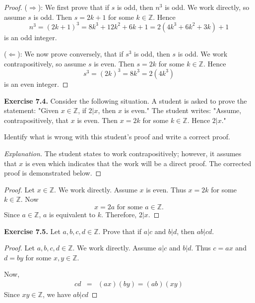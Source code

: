 \documentclass[12pt,oneside]{article}
\newenvironment{exercise}[1]{\vspace{.1in}\noindent\textbf{Exercise #1 \hspace{.05em}}}{}
\newcommand{\Z}{\mathbb{Z}}
\begin{document}
\begin{proof}
($\Rightarrow$): We first prove that if $s$ is odd, then $n^3$ is odd. We work directly, so assume $s$ is odd. Then $s=2k + 1$ for some $k \in \Z$. Hence
\[n^3 = (2k + 1)^3=8k^3+12k^2+6k+1=2(4k^3+6k^2+3k)+1\]
is an odd integer.

($\Leftarrow$): We now prove conversely, that if $s^3$ is odd, then $s$ is odd. We work contrapositively, so assume $s$ is even. Then $s = 2k$ for some $k \in \Z$. Hence
\[s^3=(2k)^3=8k^3=2(4k^3)\]
is an even integer. 
    
\end{proof}



\begin{exercise}{7.4.}
Consider the following situation. A student is asked to prove the statement: "Given $x \in \Z$, if $2|x$, then $x$ is even." The student writes: "Assume, contrapositively, that $x$ is even. Then $x = 2k$ for some $k \in \Z$. Hence $2|x$."

Identify what is wrong with this student's proof and write a correct proof.
\end{exercise}

\begin{proof}[Explanation]
The student states to work contrapositively; however, it assumes that $x$ is even which indicates that the work will be a direct proof. The corrected proof is demonstrated below.
\end{proof}

\begin{proof}
Let $x \in \Z$. We work directly. Assume $x$ is even. Thus $x = 2k$ for some $k \in \Z$. Now
\[x = 2a \text{ for some } a \in \Z.\]
Since $a \in \Z$, $a$ is equivalent to $k$. Therefore, $2|x$.
\end{proof}



\begin{exercise}{7.5.}
Let $a,b,c,d \in \Z$. Prove that if $a|c$ and $b|d$, then $ab|cd$.
\end{exercise}

\begin{proof}
Let $a,b,c,d \in \Z$. We work directly. Assume $a|c$ and $b|d$. Thus $c=ax$ and $d=by$ for some $x,y \in \Z$. 

Now,
\begin{eqnarray*}
cd &=& (ax)(by) = (ab)(xy)
\end{eqnarray*}
Since $xy \in \Z$, we have $ab|cd$
\end{proof}
\end{document}
